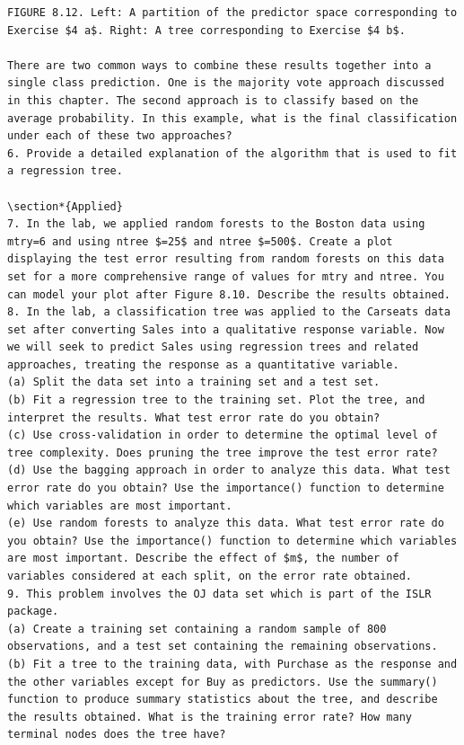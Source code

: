 \documentclass[10pt]{article}
\begin{document}
\begin{verbatim}
FIGURE 8.12. Left: A partition of the predictor space corresponding to Exercise $4 a$. Right: A tree corresponding to Exercise $4 b$.

There are two common ways to combine these results together into a single class prediction. One is the majority vote approach discussed in this chapter. The second approach is to classify based on the average probability. In this example, what is the final classification under each of these two approaches?
6. Provide a detailed explanation of the algorithm that is used to fit a regression tree.

\section*{Applied}
7. In the lab, we applied random forests to the Boston data using mtry=6 and using ntree $=25$ and ntree $=500$. Create a plot displaying the test error resulting from random forests on this data set for a more comprehensive range of values for mtry and ntree. You can model your plot after Figure 8.10. Describe the results obtained.
8. In the lab, a classification tree was applied to the Carseats data set after converting Sales into a qualitative response variable. Now we will seek to predict Sales using regression trees and related approaches, treating the response as a quantitative variable.
(a) Split the data set into a training set and a test set.
(b) Fit a regression tree to the training set. Plot the tree, and interpret the results. What test error rate do you obtain?
(c) Use cross-validation in order to determine the optimal level of tree complexity. Does pruning the tree improve the test error rate?
(d) Use the bagging approach in order to analyze this data. What test error rate do you obtain? Use the importance() function to determine which variables are most important.
(e) Use random forests to analyze this data. What test error rate do you obtain? Use the importance() function to determine which variables are most important. Describe the effect of $m$, the number of variables considered at each split, on the error rate obtained.
9. This problem involves the OJ data set which is part of the ISLR package.
(a) Create a training set containing a random sample of 800 observations, and a test set containing the remaining observations.
(b) Fit a tree to the training data, with Purchase as the response and the other variables except for Buy as predictors. Use the summary() function to produce summary statistics about the tree, and describe the results obtained. What is the training error rate? How many terminal nodes does the tree have?

\end{verbatim}
\end{document}

